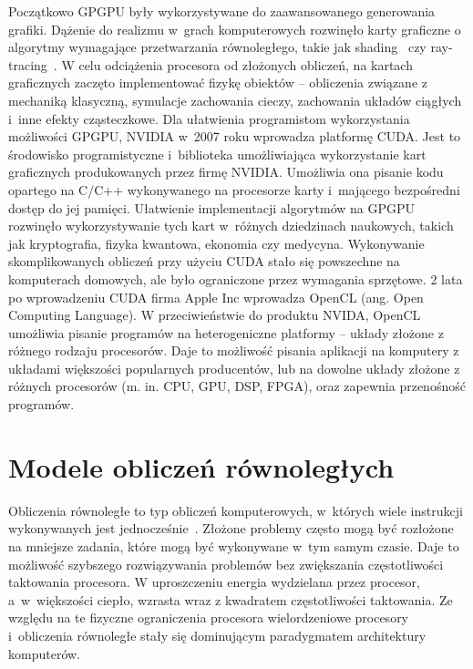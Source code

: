 Początkowo GPGPU były wykorzystywane do zaawansowanego generowania grafiki. Dążenie do realizmu w~grach komputerowych rozwinęło karty graficzne o algorytmy wymagające przetwarzania równoległego, takie jak shading~\cite{b18} czy ray-tracing~\cite{b3}. W celu odciążenia procesora od złożonych obliczeń, na kartach graficznych zaczęto implementować fizykę obiektów – obliczenia związane z mechaniką klasyczną, symulacje zachowania cieczy, zachowania układów ciągłych i~inne efekty cząsteczkowe. Dla ułatwienia programistom wykorzystania możliwości GPGPU, NVIDIA w~2007 roku wprowadza platformę CUDA. Jest to środowisko programistyczne i~biblioteka umożliwiająca wykorzystanie kart graficznych produkowanych przez firmę NVIDIA. Umożliwia ona pisanie kodu opartego na C/C++ wykonywanego na procesorze karty i~mającego bezpośredni dostęp do jej pamięci. Ułatwienie implementacji algorytmów na GPGPU rozwinęło wykorzystywanie tych kart w~różnych dziedzinach naukowych, takich jak kryptografia, fizyka kwantowa, ekonomia czy medycyna. Wykonywanie  skomplikowanych obliczeń przy użyciu CUDA stało się powszechne na komputerach domowych, ale było ograniczone przez wymagania sprzętowe. 2 lata po wprowadzeniu CUDA firma Apple Inc wprowadza OpenCL (ang. Open Computing Language). W przeciwieństwie do produktu NVIDA, OpenCL umożliwia pisanie programów na heterogeniczne platformy – układy złożone z różnego rodzaju procesorów. Daje to możliwość pisania aplikacji na komputery z układami większości popularnych producentów, lub  na dowolne układy złożone z różnych procesorów (m. in. CPU, GPU, DSP, FPGA), oraz zapewnia przenośność programów.



\section{Modele obliczeń równoległych}\label{sec:Paralellism}

Obliczenia równoległe to typ obliczeń komputerowych, w~których wiele instrukcji wykonywanych jest jednocześnie~\cite{b14}. Złożone problemy często mogą być rozłożone na mniejsze zadania, które mogą być wykonywane w~tym samym czasie. Daje to możliwość szybszego rozwiązywania problemów bez zwiększania częstotliwości taktowania procesora. W uproszczeniu energia wydzielana przez procesor, a~w~większości ciepło, wzrasta wraz z kwadratem częstotliwości taktowania. Ze względu na te fizyczne ograniczenia procesora wielordzeniowe procesory i~obliczenia równoległe stały się dominującym paradygmatem architektury komputerów.

